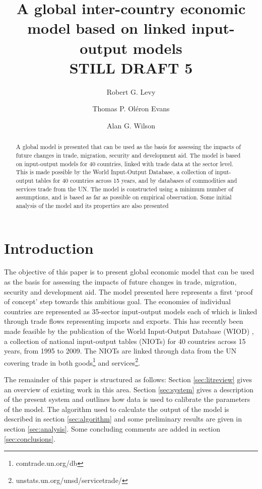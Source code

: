 \documentclass[a4paper]{article}
\title{A global inter-country economic model based on linked input-output models \\ STILL DRAFT 5}
\author[*]{Robert G. Levy}
\author[**]{Thomas P. Ol\'{e}ron Evans}
\author[*]{Alan G. Wilson}
\affil[*]{Centre for Advanced Spatial Analysis, UCL Bartlett Faculty of the Built Environment,
90 Tottenham Court Road, London W1T 4TJ, UK}
\affil[**]{Department of Mathematics, University College London, Gower Street, London WC1E 6BT, UK}
\begin{document}
\maketitle

\begin{abstract}
A global model is presented that can be used as the basis for assessing the impacts of future changes in trade, migration, security and development aid.
The model is based on input-output models for 40 countries, linked with trade data at the sector level.
This is made possible by the World Input-Output Database, a collection of input-output tables for 40 countries across 15 years, and by databases of commodities and services trade from the UN.
The model is constructed using a minimum number of assumptions, and is based as far as possible on empirical observation.
Some initial analysis of the model and its properties are also presented
\end{abstract}

\section{Introduction}
The objective of this paper is to present global economic model that can be used as the basis for assessing the impacts of future changes in trade, migration, security and development aid.
The model presented here represents a first `proof of concept' step towards this ambitious goal.
The economies of individual countries are represented as 35-sector input-output models each of which is linked through trade flows representing imports and exports.
This has recently been made feasible by the publication of the World Input-Output Database (WIOD) \parencite{Timmer2012}, a collection of national input-output tables (NIOTs) for 40 countries across 15 years, from 1995 to 2009.
The NIOTs are linked through data from the UN covering trade in both goods\footnote{comtrade.un.org/db} and services\footnote{unstats.un.org/unsd/servicetrade/}.

The remainder of this paper is structured as follows: 
Section \ref{sec:litreview} gives an overview of existing work in this area.
Section \ref{sec:system} gives a description of the present system and outlines how data is used to calibrate the parameters of the model.
The algorithm used to calculate the output of the model is described in section \ref{sec:algorithm} and some preliminary results are given in section \ref{sec:analysis}.
Some concluding comments are added in section \ref{sec:conclusions}.
\end{document}
